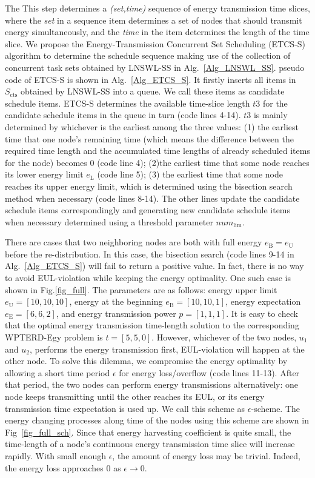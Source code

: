 \documentclass[journal,10pt]{IEEEtran}
\begin{document}
The This step determines a \textit{(set,time)} sequence of energy transmission time slices, where the \textit{set} in a sequence item determines a set of nodes that should transmit energy simultaneously, and the \textit{time} in the item determines the length of the time slice. We propose the Energy-Transmission Concurrent Set Scheduling (ETCS-S) algorithm to determine the schedule sequence making use of the collection of concurrent task sets obtained by LNSWL-SS in Alg.~\ref{Alg_LNSWL_SS}.
pseudo code of ETCS-S is shown in Alg.~\ref{Alg_ETCS_S}. It firstly inserts all items in $S_\text{cts}$ obtained by LNSWL-SS into a queue. We call these items as candidate schedule items. ETCS-S determines the available time-slice length $t3$ for the candidate schedule items in the queue in turn (code lines 4-14). $t3$ is mainly determined by whichever is the earliest among the three values: (1) the earliest time that one node's remaining time (which means the difference between the required time length and the accumulated time lengths of already scheduled items for the node) becomes 0 (code line 4); (2)the earliest time that some node reaches its lower energy limit $e_\text{L}$ (code line 5); (3) the earliest time that some node reaches its upper energy limit, which is determined using the bisection search method when necessary (code lines 8-14). The other lines update the candidate schedule items correspondingly and generating new candidate schedule items when necessary determined using a threshold parameter $num_\text{lim}$.

There are cases that two neighboring nodes are both with full energy $e_\text{B}{=}e_\text{U}$ before the re-distribution. In this case, the bisection search (code lines 9-14 in Alg.~\ref{Alg_ETCS_S}) will fail to return a positive value. In fact, there is no way to avoid EUL-violation while keeping the energy optimality. One such case is shown in Fig.\ref{fig_full}. The parameters are as follows: energy upper limit $e_\text{U}{=}[10,10,10]$, energy at the beginning $e_\text{B}{=}[10,10,1]$, energy expectation $e_\text{E}{=}[6,6,2]$, and energy transmission power $p{=}[1,1,1]$. It is easy to check that the optimal energy transmission time-length solution to the corresponding WPTERD-Egy problem is $t{=}[5,5,0]$. However, whichever of the two nodes, $u_1$ and $u_2$, performs the energy transmission first, EUL-violation will happen at the other node. To solve this dilemma, we compromise the energy optimality by allowing a short time period $\epsilon$ for energy loss/overflow (code lines 11-13). After that period, the two nodes can perform energy transmissions alternatively: one node keeps transmitting until the other reaches its EUL, or its energy transmission time expectation is used up. We call this scheme as $\epsilon${-}scheme. The energy changing processes along time of the nodes using this scheme are shown in Fig~\ref{fig_full_sch}. Since that energy harvesting coefficient is quite small, the time-length of a node's continuous energy transmission time slice will increase rapidly. With small enough $\epsilon$, the amount of energy loss may be trivial. Indeed, the energy loss approaches 0 as $\epsilon{\rightarrow}0$.
\end{document}
